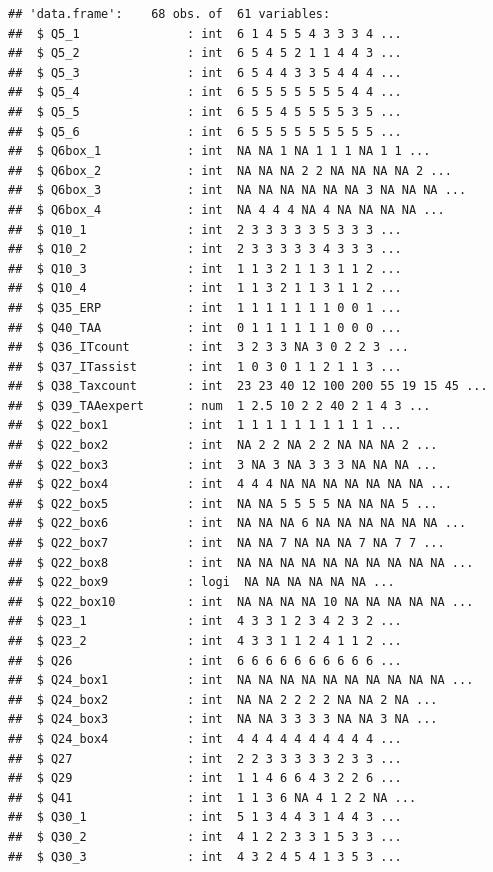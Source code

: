 \documentclass[
]{article}
\begin{document}
\begin{verbatim}
## 'data.frame':    68 obs. of  61 variables:
##  $ Q5_1               : int  6 1 4 5 5 4 3 3 3 4 ...
##  $ Q5_2               : int  6 5 4 5 2 1 1 4 4 3 ...
##  $ Q5_3               : int  6 5 4 4 3 3 5 4 4 4 ...
##  $ Q5_4               : int  6 5 5 5 5 5 5 5 4 4 ...
##  $ Q5_5               : int  6 5 5 4 5 5 5 5 3 5 ...
##  $ Q5_6               : int  6 5 5 5 5 5 5 5 5 5 ...
##  $ Q6box_1            : int  NA NA 1 NA 1 1 1 NA 1 1 ...
##  $ Q6box_2            : int  NA NA NA 2 2 NA NA NA NA 2 ...
##  $ Q6box_3            : int  NA NA NA NA NA NA 3 NA NA NA ...
##  $ Q6box_4            : int  NA 4 4 4 NA 4 NA NA NA NA ...
##  $ Q10_1              : int  2 3 3 3 3 3 5 3 3 3 ...
##  $ Q10_2              : int  2 3 3 3 3 3 4 3 3 3 ...
##  $ Q10_3              : int  1 1 3 2 1 1 3 1 1 2 ...
##  $ Q10_4              : int  1 1 3 2 1 1 3 1 1 2 ...
##  $ Q35_ERP            : int  1 1 1 1 1 1 1 0 0 1 ...
##  $ Q40_TAA            : int  0 1 1 1 1 1 1 0 0 0 ...
##  $ Q36_ITcount        : int  3 2 3 3 NA 3 0 2 2 3 ...
##  $ Q37_ITassist       : int  1 0 3 0 1 1 2 1 1 3 ...
##  $ Q38_Taxcount       : int  23 23 40 12 100 200 55 19 15 45 ...
##  $ Q39_TAAexpert      : num  1 2.5 10 2 2 40 2 1 4 3 ...
##  $ Q22_box1           : int  1 1 1 1 1 1 1 1 1 1 ...
##  $ Q22_box2           : int  NA 2 2 NA 2 2 NA NA NA 2 ...
##  $ Q22_box3           : int  3 NA 3 NA 3 3 3 NA NA NA ...
##  $ Q22_box4           : int  4 4 4 NA NA NA NA NA NA NA ...
##  $ Q22_box5           : int  NA NA 5 5 5 5 NA NA NA 5 ...
##  $ Q22_box6           : int  NA NA NA 6 NA NA NA NA NA NA ...
##  $ Q22_box7           : int  NA NA 7 NA NA NA 7 NA 7 7 ...
##  $ Q22_box8           : int  NA NA NA NA NA NA NA NA NA NA ...
##  $ Q22_box9           : logi  NA NA NA NA NA NA ...
##  $ Q22_box10          : int  NA NA NA NA 10 NA NA NA NA NA ...
##  $ Q23_1              : int  4 3 3 1 2 3 4 2 3 2 ...
##  $ Q23_2              : int  4 3 3 1 1 2 4 1 1 2 ...
##  $ Q26                : int  6 6 6 6 6 6 6 6 6 6 ...
##  $ Q24_box1           : int  NA NA NA NA NA NA NA NA NA NA ...
##  $ Q24_box2           : int  NA NA 2 2 2 2 NA NA 2 NA ...
##  $ Q24_box3           : int  NA NA 3 3 3 3 NA NA 3 NA ...
##  $ Q24_box4           : int  4 4 4 4 4 4 4 4 4 4 ...
##  $ Q27                : int  2 2 3 3 3 3 3 2 3 3 ...
##  $ Q29                : int  1 1 4 6 6 4 3 2 2 6 ...
##  $ Q41                : int  1 1 3 6 NA 4 1 2 2 NA ...
##  $ Q30_1              : int  5 1 3 4 4 3 1 4 4 3 ...
##  $ Q30_2              : int  4 1 2 2 3 3 1 5 3 3 ...
##  $ Q30_3              : int  4 3 2 4 5 4 1 3 5 3 ...

\end{verbatim}
\end{document}
